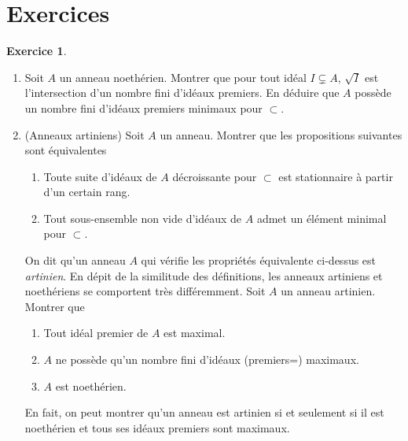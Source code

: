 \documentclass[a4paper, oneside, 12pt]{book}
\theoremstyle{theoremeStyle} %
\theoremstyle{definition} %
\newtheorem{exercice}[theoreme]{Exercice}
\begin{document}
\section{Exercices}

\begin{exercice}\label{NoethExercices}
  \begin{enumerate}[leftmargin=* ,parsep=0cm,itemsep=0cm,topsep=0cm]
  \item Soit $A$ un anneau noethérien. Montrer que pour tout idéal  $I\subsetneq A$, $\sqrt{I}$ est l'intersection d'un nombre fini d'idéaux premiers. En déduire que $A$ possède un nombre fini d'idéaux premiers minimaux pour $\subset$. \\
  \item (Anneaux artiniens) Soit $A$ un anneau. Montrer que les propositions suivantes sont équivalentes\\
    \begin{enumerate}
    \item Toute suite d'idéaux de $A$ décroissante pour $\subset$ est stationnaire à partir d'un certain rang.
    \item Tout sous-ensemble non vide d'idéaux de $A$ admet un élément minimal pour $\subset $.\\
    \end{enumerate}
    On dit qu'un anneau $A$ qui vérifie les propriétés équivalente ci-dessus est \textit{artinien}. En dépit de la similitude des définitions, les anneaux artiniens et noethériens se comportent très différemment. Soit $A$ un anneau artinien. Montrer que\\
    \begin{enumerate}
    \item  Tout idéal premier de $A $ est maximal.
    \item  $A$ ne possède qu'un nombre fini d'idéaux (premiers=) maximaux.
    \item  $A$ est noethérien.\\
    \end{enumerate}
    En fait, on peut montrer qu'un anneau est artinien si et seulement si il est noethérien et tous ses idéaux premiers sont maximaux.
  \end{enumerate}
\end{exercice}
\end{document}

